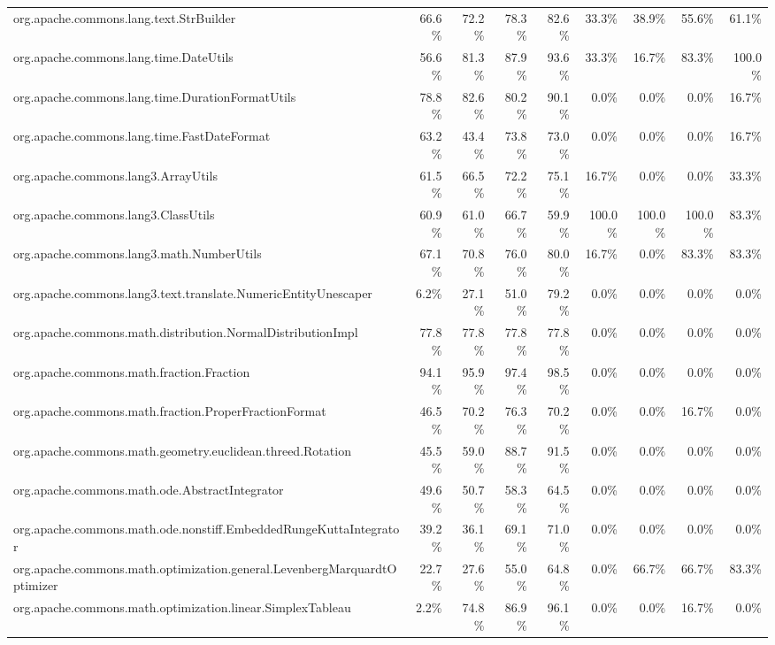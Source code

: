\begin{tabular}{ l rrrr rrrr}
org.apache.commons.lang.text.StrBuilder &  66.6\% &  72.2\% &  78.3\% &  82.6\% &  33.3\% &  38.9\% &  55.6\% &  61.1\%\\ 
org.apache.commons.lang.time.DateUtils &  56.6\% &  81.3\% &  87.9\% &  93.6\% &  33.3\% &  16.7\% &  83.3\% &  100.0\%\\ 
org.apache.commons.lang.time.DurationFormatUtils &  78.8\% &  82.6\% &  80.2\% &  90.1\% &  0.0\% &  0.0\% &  0.0\% &  16.7\%\\ 
org.apache.commons.lang.time.FastDateFormat &  63.2\% &  43.4\% &  73.8\% &  73.0\% &  0.0\% &  0.0\% &  0.0\% &  16.7\%\\ 
org.apache.commons.lang3.ArrayUtils &  61.5\% &  66.5\% &  72.2\% &  75.1\% &  16.7\% &  0.0\% &  0.0\% &  33.3\%\\ 
org.apache.commons.lang3.ClassUtils &  60.9\% &  61.0\% &  66.7\% &  59.9\% &  100.0\% &  100.0\% &  100.0\% &  83.3\%\\ 
org.apache.commons.lang3.math.NumberUtils &  67.1\% &  70.8\% &  76.0\% &  80.0\% &  16.7\% &  0.0\% &  83.3\% &  83.3\%\\ 
org.apache.commons.lang3.text.translate.NumericEntityUnescaper &  6.2\% &  27.1\% &  51.0\% &  79.2\% &  0.0\% &  0.0\% &  0.0\% &  0.0\%\\ 
org.apache.commons.math.distribution.NormalDistributionImpl &  77.8\% &  77.8\% &  77.8\% &  77.8\% &  0.0\% &  0.0\% &  0.0\% &  0.0\%\\ 
org.apache.commons.math.fraction.Fraction &  94.1\% &  95.9\% &  97.4\% &  98.5\% &  0.0\% &  0.0\% &  0.0\% &  0.0\%\\ 
org.apache.commons.math.fraction.ProperFractionFormat &  46.5\% &  70.2\% &  76.3\% &  70.2\% &  0.0\% &  0.0\% &  16.7\% &  0.0\%\\ 
org.apache.commons.math.geometry.euclidean.threed.Rotation &  45.5\% &  59.0\% &  88.7\% &  91.5\% &  0.0\% &  0.0\% &  0.0\% &  0.0\%\\ 
org.apache.commons.math.ode.AbstractIntegrator &  49.6\% &  50.7\% &  58.3\% &  64.5\% &  0.0\% &  0.0\% &  0.0\% &  0.0\%\\ 
org.apache.commons.math.ode.nonstiff.EmbeddedRungeKuttaIntegrator &  39.2\% &  36.1\% &  69.1\% &  71.0\% &  0.0\% &  0.0\% &  0.0\% &  0.0\%\\ 
org.apache.commons.math.optimization.general.LevenbergMarquardtOptimizer &  22.7\% &  27.6\% &  55.0\% &  64.8\% &  0.0\% &  66.7\% &  66.7\% &  83.3\%\\ 
org.apache.commons.math.optimization.linear.SimplexTableau &  2.2\% &  74.8\% &  86.9\% &  96.1\% &  0.0\% &  0.0\% &  16.7\% &  0.0\%\\ 

\end{tabular}
